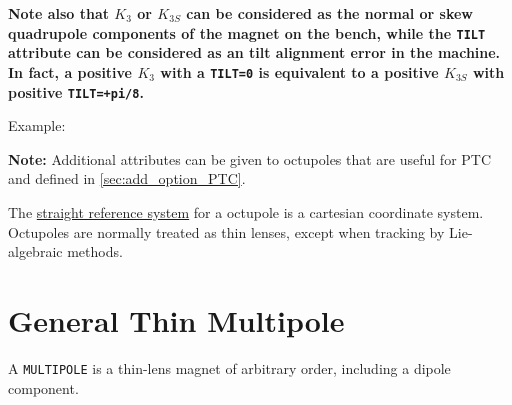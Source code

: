 \textbf{Note also that $K_3$ or $K_{3S}$ can be considered as the normal or
  skew quadrupole components of the magnet on the bench, while the {\tt TILT}
  attribute can be considered as an tilt alignment error in the
  machine. In fact, a positive $K_3$ with a {\tt TILT=0} is equivalent to a
  positive $K_{3S}$ with positive {\tt TILT=+pi/8}. } 

Example: 

{\bf Note:} Additional attributes can be given to octupoles that
are useful for PTC and defined in \ref{sec:add_option_PTC}.

The \href{local_system.html#straight}{straight reference system} for a
octupole is a cartesian coordinate system. Octupoles are normally
treated as thin lenses, except when tracking by Lie-algebraic methods.   



\section{General Thin Multipole}
\label{sec:multipole}

A {\tt MULTIPOLE} is a thin-lens magnet of arbitrary order, including a 
dipole component.


